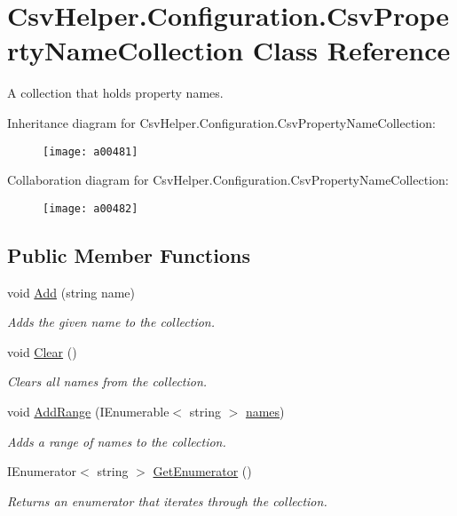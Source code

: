 \hypertarget{a00064}{\section{Csv\-Helper.\-Configuration.\-Csv\-Property\-Name\-Collection Class Reference}
\label{a00064}
}


A collection that holds property names.  




Inheritance diagram for Csv\-Helper.\-Configuration.\-Csv\-Property\-Name\-Collection\-:
\nopagebreak
\begin{figure}[H]
\begin{center}
\leavevmode
\texttt{[image: a00481]}
\end{center}
\end{figure}


Collaboration diagram for Csv\-Helper.\-Configuration.\-Csv\-Property\-Name\-Collection\-:
\nopagebreak
\begin{figure}[H]
\begin{center}
\leavevmode
\texttt{[image: a00482]}
\end{center}
\end{figure}
\subsection*{Public Member Functions}
\begin{DoxyCompactItemize}
\item 
void \hyperlink{a00064_ad7b7d11d5814bcce5ed38e054ef71b4e}{Add} (string name)
\begin{DoxyCompactList}\small\item\em Adds the given name to the collection. \end{DoxyCompactList}\item 
void \hyperlink{a00064_abec990435c8dccfb4553602b89f93201}{Clear} ()
\begin{DoxyCompactList}\small\item\em Clears all names from the collection. \end{DoxyCompactList}\item 
void \hyperlink{a00064_ac568746273968080890abca50b882802}{Add\-Range} (I\-Enumerable$<$ string $>$ \hyperlink{a00064_a41eb6804d8afe8d674e64d71f66962ce}{names})
\begin{DoxyCompactList}\small\item\em Adds a range of names to the collection. \end{DoxyCompactList}\item 
I\-Enumerator$<$ string $>$ \hyperlink{a00064_a61b6a80e51d06f17d0043ec6aef89f1b}{Get\-Enumerator} ()
\begin{DoxyCompactList}\small\item\em Returns an enumerator that iterates through the collection. \end{DoxyCompactList}\end{DoxyCompactItemize}
